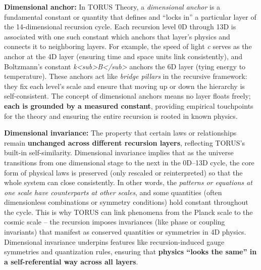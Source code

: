 \documentclass[
]{article}
\begin{document}
\textbf{Dimensional anchor:} In TORUS Theory, a \emph{dimensional
anchor} is a fundamental constant or quantity that defines and ``locks
in'' a particular layer of the 14-dimensional recursion cycle. Each
recursion level 0D through 13D is associated with one such constant
which anchors that layer's physics and connects it to neighboring
layers\hspace{0pt}. For example, the speed of light \emph{c} serves as
the anchor at the 4D layer (ensuring time and space units link
consistently), and Boltzmann's constant
\emph{k\textless sub\textgreater B\textless/sub\textgreater{}} anchors
the 6D layer (tying energy to temperature)\hspace{0pt}. These anchors
act like \emph{bridge pillars} in the recursive framework: they fix each
level's scale and ensure that moving up or down the hierarchy is
self-consistent. The concept of dimensional anchors means no layer
floats freely; \textbf{each is grounded by a measured constant},
providing empirical touchpoints for the theory and ensuring the entire
recursion is rooted in known physics\hspace{0pt}.

\textbf{Dimensional invariance:} The property that certain laws or
relationships remain \textbf{unchanged across different recursion
layers}, reflecting TORUS's built-in self-similarity. Dimensional
invariance implies that as the universe transitions from one dimensional
stage to the next in the 0D--13D cycle, the core form of physical laws
is preserved (only rescaled or reinterpreted) so that the whole system
can close consistently. In other words, the \emph{patterns or equations
at one scale have counterparts at other scales}, and some quantities
(often dimensionless combinations or symmetry conditions) hold constant
throughout the cycle\hspace{0pt}. This is why TORUS can link phenomena
from the Planck scale to the cosmic scale -- the recursion imposes
invariances (like phase or coupling invariants) that manifest as
conserved quantities or symmetries in 4D physics\hspace{0pt}.
Dimensional invariance underpins features like recursion-induced gauge
symmetries and quantization rules, ensuring that \textbf{physics ``looks
the same'' in a self-referential way across all layers}.
\end{document}
